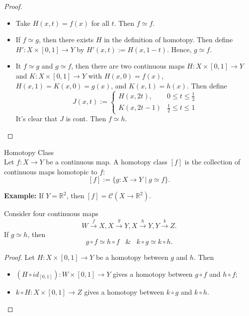\begin{proof}
    \begin{itemize}
        \item Take $H(x,t) = f(x)$ for all $t$. Then $f \simeq f$.
        \item If $f \simeq g$, then there exists $H$ in the definition of homotopy. Then define $H': X \times [0,1] \rightarrow Y$ by $H' (x,t) := H(x,1-t)$. Hence, $g \simeq f$.
        \item It $f\simeq g$ and $g \simeq f$, then there are two continuous maps $H:X \times [0,1] \rightarrow Y$ and $K: X\times [0,1] \rightarrow Y$ with $H(x,0) = f(x)$, $H(x,1) = K(x,0) = g(x)$, and $K(x,1)=h(x)$. Then define
        $$J(x,t) := \begin{cases}
            H(x,2t), &0\leq t \leq \frac{1}{2}\\
            K(x,2t-1) &\frac{1}{2} \leq t \leq 1
        \end{cases}$$
        It's clear that $J$ is cont. Then $f \simeq h$.
    \end{itemize}
\end{proof}

\begin{definition}{Homotopy Class}\\
Let $f: X \rightarrow Y$ be a continuous map. A homotopy class $[f]$ is the collection of continuous maps homotopic to $f$:
$$[f] := \{ g: X \rightarrow Y \mid g \simeq f \}.$$
\end{definition}

\noindent\textbf{Example:} If $Y = \mathbb{R}^2$, then $[f] = \mathcal{C}(X \rightarrow \mathbb{R}^2)$.

\begin{proposition}
    Consider four continuous maps
    $$W \overset{f}{\rightarrow}X, X \overset{g}{\rightarrow}Y, X \overset{h}{\rightarrow}Y, Y \overset{k}{\rightarrow}Z.$$
    If $g \simeq h$, then
    $$g \circ f \simeq h \circ f\;\;\;\&\;\;\; k \circ g \simeq k \circ h.$$
\end{proposition}

\begin{proof}
    Let $H : X \times [0,1] \rightarrow Y$ be a homotopy between $g$ and $h$. Then
    \begin{itemize}
        \item $(H \circ id_{[0,1]}) : W \times [0,1] \rightarrow Y$ gives a homotopy between $g \circ f $ and $ h \circ f$;
        \item $k \circ H : X \times [0,1] \rightarrow Z$ gives a homotopy between $k \circ g $ and $ k \circ h$.
    \end{itemize}
\end{proof}

